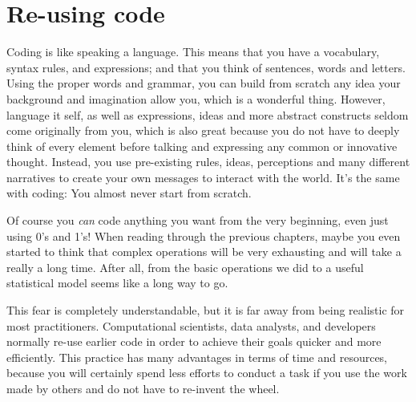 \section{Re-using code}
\label{sec:code}

Coding is like speaking a language. This means that you have a vocabulary, syntax rules, and expressions; and that you think of sentences, words and letters. Using the proper words and grammar, you can build from scratch any idea your background and imagination allow you, which is a wonderful thing. However, language it self, as well as expressions, ideas and more abstract constructs seldom come originally from you, which is also great because you do not have to deeply think of every element before talking and expressing any common or innovative thought. Instead, you use pre-existing rules, ideas, perceptions and many different narratives to create your own messages to interact with the world. It's the same with coding: You almost never start from scratch.

Of course you \emph{can} code anything you want from the very beginning, even just using 0's and 1's!
When reading through the previous chapters, maybe you even started to think that complex operations will be very exhausting and will take a really a long time. After all, from the basic operations we did to a useful statistical
model seems like a long way to go.

This fear is completely understandable, but it is far away from being realistic for most practitioners. Computational scientists, data analysts, and developers normally re-use earlier code in order to achieve their goals quicker and more efficiently. This practice has many advantages in terms of time and resources, because you will certainly spend less efforts to conduct a task if you use the work made by others and do not have to re-invent the wheel.




